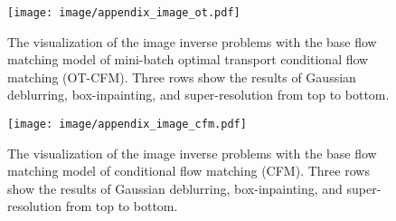 \begin{figure}[!htb]
    \centering
    \texttt{[image: image/appendix\_image\_ot.pdf]}
    \caption{The visualization of the image inverse problems with the base flow matching model of mini-batch optimal transport conditional flow matching (OT-CFM). Three rows show the results of Gaussian deblurring, box-inpainting, and super-resolution from top to bottom.}
    \label{fig:app_image_visualization_ot}
\end{figure}

\begin{figure}[!htb]
    \centering
    \texttt{[image: image/appendix\_image\_cfm.pdf]}
    \caption{The visualization of the image inverse problems with the base flow matching model of conditional flow matching (CFM). Three rows show the results of Gaussian deblurring, box-inpainting, and super-resolution from top to bottom.}
    \label{fig:app_image_visualization_cfm}
\end{figure}

